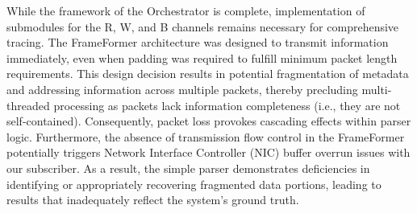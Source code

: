 While the framework of the Orchestrator is complete, implementation of submodules for the R, W, and B channels remains necessary for comprehensive \axifull~ tracing. The FrameFormer architecture was designed to transmit information immediately, even when padding was required to fulfill minimum packet length requirements. This design decision results in potential fragmentation of metadata and addressing information across multiple packets, thereby precluding multi-threaded processing as packets lack information completeness (i.e., they are not self-contained). Consequently, packet loss provokes cascading effects within parser logic. Furthermore, the absence of transmission flow control in the FrameFormer potentially triggers Network Interface Controller (NIC) buffer overrun issues with our subscriber. As a result, the simple parser demonstrates deficiencies in identifying or appropriately recovering fragmented data portions, leading to results that inadequately reflect the system's ground truth.
